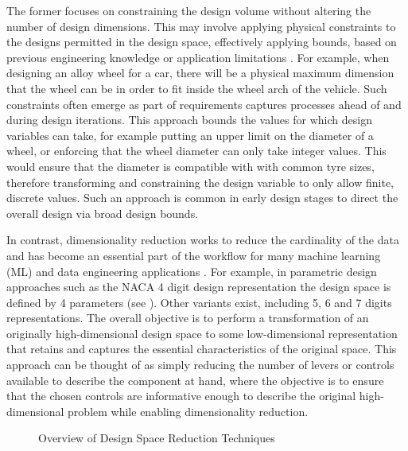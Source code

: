 \documentclass{article}
\begin{document}
The former focuses on constraining the design volume without altering the number of design dimensions. This may involve applying physical constraints to the designs permitted in the design space, effectively applying bounds, based on previous engineering knowledge or application limitations \citep{Serani2024}. For example, when designing an alloy wheel for a car, there will be a physical maximum dimension that the wheel can be in order to fit inside the wheel arch of the vehicle. Such constraints often emerge as part of requirements captures processes ahead of and during design iterations. This approach bounds the values for which design variables can take, for example putting an upper limit on the diameter of a wheel, or enforcing that the wheel diameter can only take integer values. This would ensure that the diameter is compatible with with common tyre sizes, therefore transforming and constraining the design variable to only allow finite, discrete values. Such an approach is common in early design stages to direct the overall design via broad design bounds.

In contrast, dimensionality reduction works to reduce the cardinality of the data and has become an essential part of the workflow for many machine learning (ML) and data engineering applications \citep{Mendez2022}. For example, in parametric design approaches such as the NACA 4 digit design representation the design space is defined by 4 parameters (see \cite{Jacobs1933}). Other variants exist, including 5, 6 and 7 digits representations. The overall objective is to perform a transformation of an originally high-dimensional design space to some low-dimensional representation that retains and captures the essential characteristics of the original space. This approach can be thought of as simply reducing the number of levers or controls available to describe the component at hand, where the objective is to ensure that the chosen controls are informative enough to describe the original high-dimensional problem while enabling dimensionality reduction. 

\begin{figure}[h!]
\centering
{}
\caption{Overview of Design Space Reduction Techniques}
\end{figure}
\end{document}
